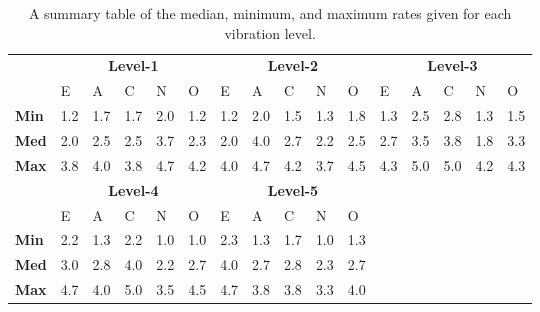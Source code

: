 \begin{table}[hbt!]
    \renewcommand{\arraystretch}{1}
    \begin{center}
        \begin{tabular}{p{}|
        p{}|p{}|p{}|p{}|p{}||
        p{}|p{}|p{}|p{}|p{}||
        p{}|p{}|p{}|p{}|p{}|}
            \cline{2-16}
            & \multicolumn{5}{c||}{\textbf{Level-1}} & \multicolumn{5}{c||}{\textbf{Level-2}}
            & \multicolumn{5}{c|}{\textbf{Level-3}} \\
            \cline{2-16}
            & E & A & C & N & O & E & A & C & N & O & E & A & C & N & O      \\
            \cline{2-16}
            \textbf{Min}    & 1.2 & 1.7 & 1.7 & 2.0 & 1.2 & 1.2 & 2.0 & 1.5 & 1.3 & 1.8 & 1.3 & 2.5 & 2.8 & 1.3 & 1.5  \\
            \textbf{Med}    & 2.0 & 2.5 & 2.5 & 3.7 & 2.3 & 2.0 & 4.0 & 2.7 & 2.2 & 2.5 & 2.7 & 3.5 & 3.8 & 1.8 & 3.3  \\
            \textbf{Max}    & 3.8 & 4.0 & 3.8 & 4.7 & 4.2 & 4.0 & 4.7 & 4.2 & 3.7 & 4.5 & 4.3 & 5.0 & 5.0 & 4.2 & 4.3 \\
            \cline{2-16}
            \cline{2-11}
            &  \multicolumn{5}{|c||}{\textbf{Level-4}} & \multicolumn{5}{|c||}{\textbf{Level-5}} \\
            \cline{2-11}
            & E & A & C & N & O & E & A & C & N & O            \\
            \cline{2-11}
            \textbf{Min}    & 2.2 & 1.3 & 2.2 & 1.0 & 1.0 & 2.3 & 1.3 & 1.7 & 1.0 & 1.3    \\
            \textbf{Med}    & 3.0 & 2.8 & 4.0 & 2.2 & 2.7 & 4.0 & 2.7 & 2.8 & 2.3 & 2.7    \\
            \textbf{Max}    & 4.7 & 4.0 & 5.0 & 3.5 & 4.5 & 4.7 & 3.8 & 3.8 & 3.3 & 4.0    \\
            \cline{2-11}
        \end{tabular}
        \caption[]{A summary table of the median, minimum, and maximum rates given for each vibration level.\footnotemark}
        \label{table:medianMM2}
    \end{center}
\end{table}

